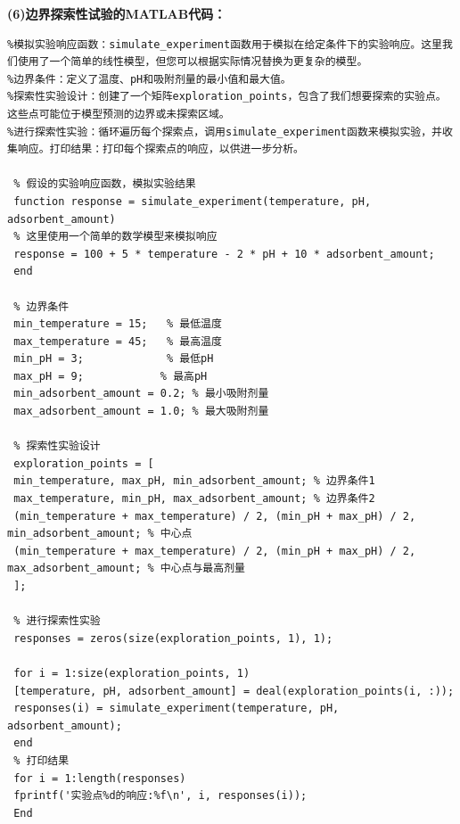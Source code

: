 \documentclass[AutoFakeBold]{ctexart}
\begin{document}
 \centering\textbf{(6)边界探索性试验的MATLAB代码：}
 \lstset{language=MATLAB}
 \lstset{breaklines}%
 \begin{lstlisting}
%模拟实验响应函数：simulate_experiment函数用于模拟在给定条件下的实验响应。这里我们使用了一个简单的线性模型，但您可以根据实际情况替换为更复杂的模型。
%边界条件：定义了温度、pH和吸附剂量的最小值和最大值。
%探索性实验设计：创建了一个矩阵exploration_points，包含了我们想要探索的实验点。这些点可能位于模型预测的边界或未探索区域。
%进行探索性实验：循环遍历每个探索点，调用simulate_experiment函数来模拟实验，并收集响应。打印结果：打印每个探索点的响应，以供进一步分析。

 % 假设的实验响应函数，模拟实验结果
 function response = simulate_experiment(temperature, pH, adsorbent_amount)
 % 这里使用一个简单的数学模型来模拟响应
 response = 100 + 5 * temperature - 2 * pH + 10 * adsorbent_amount;
 end
 
 % 边界条件
 min_temperature = 15;   % 最低温度
 max_temperature = 45;   % 最高温度
 min_pH = 3;             % 最低pH
 max_pH = 9;            % 最高pH
 min_adsorbent_amount = 0.2; % 最小吸附剂量
 max_adsorbent_amount = 1.0; % 最大吸附剂量
 
 % 探索性实验设计
 exploration_points = [
 min_temperature, max_pH, min_adsorbent_amount; % 边界条件1
 max_temperature, min_pH, max_adsorbent_amount; % 边界条件2
 (min_temperature + max_temperature) / 2, (min_pH + max_pH) / 2, min_adsorbent_amount; % 中心点
 (min_temperature + max_temperature) / 2, (min_pH + max_pH) / 2, max_adsorbent_amount; % 中心点与最高剂量
 ];
 
 % 进行探索性实验
 responses = zeros(size(exploration_points, 1), 1);
 
 for i = 1:size(exploration_points, 1)
 [temperature, pH, adsorbent_amount] = deal(exploration_points(i, :));
 responses(i) = simulate_experiment(temperature, pH, adsorbent_amount);
 end
 % 打印结果
 for i = 1:length(responses)
 fprintf('实验点%d的响应:%f\n', i, responses(i));
 End
 
 
 
 \end{lstlisting}
 
\end{document}

